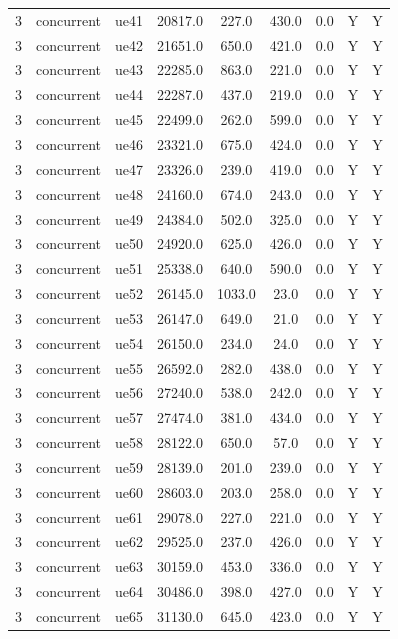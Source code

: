 \begin{table}[ht]
\begin{tabular}{|c|c|c|c|c|c|c|c|c|}
3 & concurrent & ue41 & 20817.0 & 227.0 & 430.0 & 0.0 & Y & Y \\
3 & concurrent & ue42 & 21651.0 & 650.0 & 421.0 & 0.0 & Y & Y \\
3 & concurrent & ue43 & 22285.0 & 863.0 & 221.0 & 0.0 & Y & Y \\
3 & concurrent & ue44 & 22287.0 & 437.0 & 219.0 & 0.0 & Y & Y \\
3 & concurrent & ue45 & 22499.0 & 262.0 & 599.0 & 0.0 & Y & Y \\
3 & concurrent & ue46 & 23321.0 & 675.0 & 424.0 & 0.0 & Y & Y \\
3 & concurrent & ue47 & 23326.0 & 239.0 & 419.0 & 0.0 & Y & Y \\
3 & concurrent & ue48 & 24160.0 & 674.0 & 243.0 & 0.0 & Y & Y \\
3 & concurrent & ue49 & 24384.0 & 502.0 & 325.0 & 0.0 & Y & Y \\
3 & concurrent & ue50 & 24920.0 & 625.0 & 426.0 & 0.0 & Y & Y \\
3 & concurrent & ue51 & 25338.0 & 640.0 & 590.0 & 0.0 & Y & Y \\
3 & concurrent & ue52 & 26145.0 & 1033.0 & 23.0 & 0.0 & Y & Y \\
3 & concurrent & ue53 & 26147.0 & 649.0 & 21.0 & 0.0 & Y & Y \\
3 & concurrent & ue54 & 26150.0 & 234.0 & 24.0 & 0.0 & Y & Y \\
3 & concurrent & ue55 & 26592.0 & 282.0 & 438.0 & 0.0 & Y & Y \\
3 & concurrent & ue56 & 27240.0 & 538.0 & 242.0 & 0.0 & Y & Y \\
3 & concurrent & ue57 & 27474.0 & 381.0 & 434.0 & 0.0 & Y & Y \\
3 & concurrent & ue58 & 28122.0 & 650.0 & 57.0 & 0.0 & Y & Y \\
3 & concurrent & ue59 & 28139.0 & 201.0 & 239.0 & 0.0 & Y & Y \\
3 & concurrent & ue60 & 28603.0 & 203.0 & 258.0 & 0.0 & Y & Y \\
3 & concurrent & ue61 & 29078.0 & 227.0 & 221.0 & 0.0 & Y & Y \\
3 & concurrent & ue62 & 29525.0 & 237.0 & 426.0 & 0.0 & Y & Y \\
3 & concurrent & ue63 & 30159.0 & 453.0 & 336.0 & 0.0 & Y & Y \\
3 & concurrent & ue64 & 30486.0 & 398.0 & 427.0 & 0.0 & Y & Y \\
3 & concurrent & ue65 & 31130.0 & 645.0 & 423.0 & 0.0 & Y & Y \\

\end{tabular}
\end{table}

